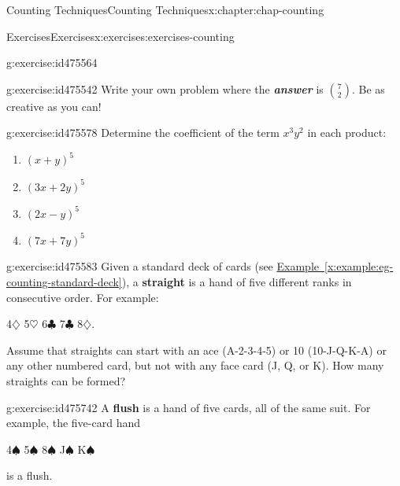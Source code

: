 \documentclass[oneside,10pt,]{book}
\newcommand{\xreffont}{\relax}
\newcommand{\alert}[1]{\textbf{\textit{#1}}}
\newcommand{\terminology}[1]{\textbf{#1}}
\numberwithin{equation}{section}
\begin{document}
\begin{chapterptx}{Counting Techniques}{}{Counting Techniques}{}{}{x:chapter:chap-counting}
\begin{exercises-section}{Exercises}{}{Exercises}{}{}{x:exercises:exercises-counting}
\begin{divisionexercise}{5}{}{}{g:exercise:id475564}
\end{divisionexercise}%
\begin{divisionexercise}{6}{}{}{g:exercise:id475542}%
Write your own problem where the \alert{answer} is \(\displaystyle\binom{7}{2}\). Be as creative as you can!%
\end{divisionexercise}%
\begin{divisionexercise}{7}{}{}{g:exercise:id475578}%
Determine the coefficient of the term \(x^3y^2\) in each product:%
\begin{enumerate}[label=(\alph*)]
\item{}\(\displaystyle (x+y)^5\)%
\item{}\(\displaystyle (3x+2y)^5\)%
\item{}\(\displaystyle (2x-y)^5\)%
\item{}\(\displaystyle (7x + 7y)^5\)%
\end{enumerate}
%
\end{divisionexercise}%
\begin{divisionexercise}{8}{}{}{g:exercise:id475583}%
Given a standard deck of cards (see \hyperref[x:example:eg-counting-standard-deck]{Example~{\xreffont\ref{x:example:eg-counting-standard-deck}}}), a \terminology{straight} is a hand of five different ranks in consecutive order. For example:%
\begin{sidebyside}{1}{0.3}{0.3}{0}%
\begin{sbspanel}{0.4}%
4\(\diamondsuit\) 5\(\heartsuit\) 6\(\clubsuit\) 7\(\clubsuit\) 8\(\diamondsuit\).%
\end{sbspanel}%
\end{sidebyside}%
\par
Assume that straights can start with an ace (A-2-3-4-5) or 10 (10-J-Q-K-A) or any other numbered card, but not with any face card (J, Q, or K). How many straights can be formed?%
\end{divisionexercise}%
\begin{divisionexercise}{9}{}{}{g:exercise:id475742}%
A \terminology{flush} is a hand of five cards, all of the same suit. For example, the five-card hand%
\begin{sidebyside}{1}{0.3}{0.3}{0}%
\begin{sbspanel}{0.4}%
4\(\spadesuit\) 5\(\spadesuit\) 8\(\spadesuit\) J\(\spadesuit\) K\(\spadesuit\)%
\end{sbspanel}%
\end{sidebyside}%
\par
is a flush.%
\par
%
\begin{enumerate}[label=(\alph*)]

\end{enumerate}
\end{divisionexercise}
\end{exercises-section}
\end{chapterptx}
\end{document}
